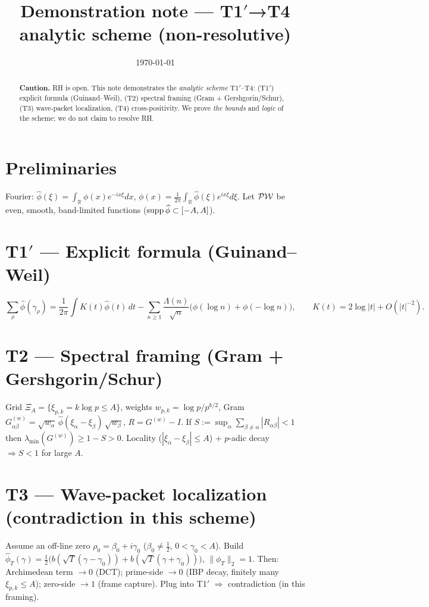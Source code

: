 \documentclass[11pt,a4paper]{proofarticle}
\title{Demonstration note — T1$′$→T4 analytic scheme (non-resolutive)}
\author{\InterIAauthors}
\date{\today}
\begin{document}


\maketitle
\begin{abstract}
\textbf{Caution.} RH is open. This note demonstrates the \emph{analytic scheme} T1$′$–T4:
(T1$′$) explicit formula (Guinand–Weil), (T2) spectral framing (Gram + Gershgorin/Schur),
(T3) wave-packet localization, (T4) cross-positivity. We prove \emph{the bounds} and
\emph{logic} of the scheme; we do not claim to resolve RH.
\end{abstract}

\section*{Preliminaries}
Fourier: $\widehat\phi(\xi)=\int_{\mathbb R}\phi(x)e^{-ix\xi}dx$, $\phi(x)=\frac{1}{2\pi}\int_{\mathbb R}\widehat\phi(\xi)e^{ix\xi}d\xi$.
Let $\mathcal{PW}$ be even, smooth, band-limited functions ($\operatorname{supp}\widehat\phi\subset[-A,A]$).

\section*{\texorpdfstring{T1$′$ — Explicit formula (Guinand–Weil)}{T1′ — Explicit formula (Guinand–Weil)}}
\[
\sum_{\rho}\widehat\phi(\gamma_\rho)=\frac{1}{2\pi}\int K(t)\widehat\phi(t)\,dt
-\sum_{n\ge 1}\frac{\Lambda(n)}{\sqrt n}\big(\phi(\log n)+\phi(-\log n)\big),
\qquad K(t)=2\log|t|+O(|t|^{-2}).
\]

\section*{T2 — Spectral framing (Gram + Gershgorin/Schur)}
Grid $\Xi_A=\{\xi_{p,k}=k\log p\le A\}$, weights $w_{p,k}=\log p/p^{k/2}$, Gram
$G^{(w)}_{\alpha\beta}=\sqrt{w_\alpha}\,\widehat\phi(\xi_\alpha-\xi_\beta)\,\sqrt{w_\beta}$, $R=G^{(w)}-I$.
If $S:=\sup_\alpha\sum_{\beta\ne\alpha}|R_{\alpha\beta}|<1$ then $\lambda_{\min}(G^{(w)})\ge 1-S>0$.
Locality ($|\xi_\alpha-\xi_\beta|\le A$) + $p$-adic decay $\Rightarrow S<1$ for large $A$.

\section*{T3 — Wave-packet localization (contradiction in this scheme)}
Assume an off-line zero $\rho_0=\beta_0+i\gamma_0$ ($\beta_0\ne\tfrac12$, $0<\gamma_0<A$). Build
$\widehat\phi_T(\gamma)=\tfrac12\big(b(\sqrt{T}(\gamma-\gamma_0))+b(\sqrt{T}(\gamma+\gamma_0))\big)$, $\|\phi_T\|_2=1$.
Then: Archimedean term $\to 0$ (DCT); prime-side $\to 0$ (IBP decay, finitely many $\xi_{p,k}\le A$);
zero-side $\to 1$ (frame capture). Plug into T1$′$ $\Rightarrow$ contradiction (in this framing).
\end{document}
